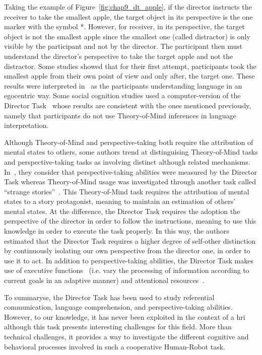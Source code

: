 Taking the example of Figure~\ref{fig:chap9_dt_apple}, if the director instructs the receiver to take the smallest apple, the target object in its perspective is the one marker with the symbol *. However, for receiver, in its perspective, the target object is not the smallest apple since the smallest one (called distractor) is only visible by the participant and not by the director. The participant then must understand the director's perspective to take the target apple and not the distractor. Some studies showed that for their first attempt, participants took the smallest apple from their own point of view and only after, the target one. These results were interpreted in~\cite{keysar_1994_illusory, keysar_1998_egocentric, keysar_2002_self, keysar_2003_limits} as the participants understanding language in an egocentric way. Some social cognition studies used a computer-version of the Director Task~\cite{dumontheil_2010_online} whose results are consistent with the ones mentioned previously, namely that participants do not use Theory-of-Mind inferences in language interpretation.

Although Theory-of-Mind and perspective-taking both require the attribution of mental states to others, some authors trend at distinguising Theory-of-Mind tasks and perspective-taking tasks as involving distinct although related mechanisms. In~\cite{santiesteban_2012_training}, they consider that perspective-taking abilities were measured by the Director Task whereas Theory-of-Mind usage was investigated through another task called ``strange stories''~\cite{happe_1994_advanced}. This Theory-of-Mind task requires the attribution of mental states to a story protagonist, meaning to maintain an estimation of others' mental states. At the difference, the Director Task requires the adoption the perspective of the director in order to follow the instructions, meaning to use this knowledge in order to execute the task properly. 
In this way, the authors estimated that the Director Task requires a higher degree of self-other distinction by continuously isolating our own perspective from the director one, in order to use it to act. In addition to perspective-taking abilities, the Director Task makes use of executive functions~\cite{rubio_2017_director} (i.e. vary the processing of information according to current goals in an adaptive manner) and attentional resources~\cite{lin_2010_reflexively}.

\newpage

To summaryse, the Director Task has been used to study referential communication, language comprehension, and perspective-taking abilities. However, to our knowledge, it has never been exploited in the context of a \acrshort{hri} although this task presents interesting challenges for this field. More than technical challenges, it provides a way to investigate the different cognitive and behavioral processes involved in such a cooperative Human-Robot task.

